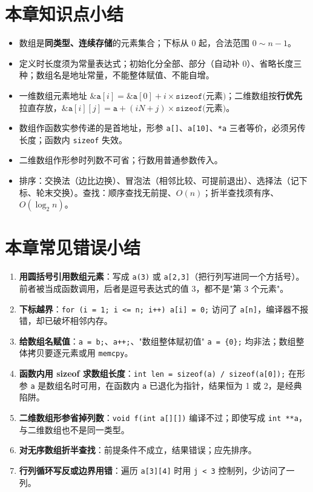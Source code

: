 \section{本章知识点小结}
\begin{itemize}
  \item 数组是\textbf{同类型、连续存储}的元素集合；下标从 0 起，合法范围 $0\sim n-1$。
  \item 定义时长度须为常量表达式；初始化分全部、部分（自动补 0）、省略长度三种；数组名是地址常量，不能整体赋值、不能自增。
  \item 一维数组元素地址 $\&\texttt{a}[i]=\&\texttt{a}[0]+i\times\texttt{sizeof(元素)}$；二维数组按\textbf{行优先}拉直存放，$\&\texttt{a}[i][j]=\texttt{a}+(iN+j)\times\texttt{sizeof(元素)}$。
  \item 数组作函数实参传递的是首地址，形参 \texttt{a[]}、\texttt{a[10]}、\texttt{*a} 三者等价，必须另传长度；函数内 \texttt{sizeof} 失效。
  \item 二维数组作形参时列数不可省；行数用普通参数传入。
  \item 排序：交换法（边比边换）、冒泡法（相邻比较、可提前退出）、选择法（记下标、轮末交换）。查找：顺序查找无前提、$O(n)$；折半查找须有序、$O(\log_2 n)$。
\end{itemize}

\section{本章常见错误小结}
\begin{enumerate}
  \item \textbf{用圆括号引用数组元素}：写成 \texttt{a(3)} 或 \texttt{a[2,3]}（把行列写进同一个方括号）。前者被当成函数调用，后者是逗号表达式的值 3，都不是"第 3 个元素"。
  \item \textbf{下标越界}：\texttt{for (i = 1; i <= n; i++) a[i] = 0;} 访问了 \texttt{a[n]}，编译器不报错，却已破坏相邻内存。
  \item \textbf{给数组名赋值}：\texttt{a = b;}、\texttt{a++;}、"数组整体赋初值" \texttt{a = \{0\};} 均非法；数组整体拷贝要逐元素或用 \texttt{memcpy}。
  \item \textbf{函数内用 sizeof 求数组长度}：\texttt{int len = sizeof(a) / sizeof(a[0]);} 在形参 \texttt{a} 是数组名时可用，在函数内 \texttt{a} 已退化为指针，结果恒为 1 或 2，是经典陷阱。
  \item \textbf{二维数组形参省掉列数}：\texttt{void f(int a[][])} 编译不过；即使写成 \texttt{int **a}，与二维数组也不是同一类型。
  \item \textbf{对无序数组折半查找}：前提条件不成立，结果错误；应先排序。
  \item \textbf{行列循环写反或边界用错}：遍历 \texttt{a[3][4]} 时用 \texttt{j < 3} 控制列，少访问了一列。
\end{enumerate}
